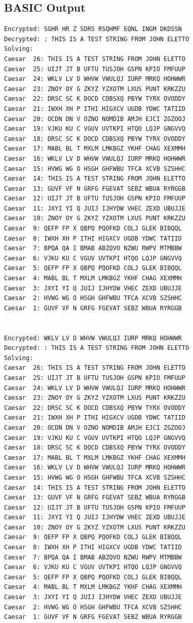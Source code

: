 \documentclass{report}
\begin{document}
\subsection*{BASIC Output}

\begin{lstlisting}
Encrypted: SGHR HR Z SDRS RSQHMF EQNL INGM DKDSSN
Decrypted: : THIS IS A TEST STRING FROM JOHN ELETTO
Solving:
Caesar  26: THIS IS A TEST STRING FROM JOHN ELETTO
Caesar  25: UIJT JT B UFTU TUSJOH GSPN KPIO FMFUUP
Caesar  24: WKLV LV D WHVW VWULQJ IURP MRKQ HOHWWR
Caesar  23: ZNOY OY G ZKYZ YZXOTM LXUS PUNT KRKZZU
Caesar  22: DRSC SC K DOCD CDBSXQ PBYW TYRX OVODDY
Caesar  21: IWXH XH P ITHI HIGXCV UGDB YDWC TATIID
Caesar  20: OCDN DN V OZNO NOMDIB AMJH EJCI ZGZOOJ
Caesar  19: VJKU KU C VGUV UVTKPI HTQO LQJP GNGVVQ
Caesar  18: DRSC SC K DOCD CDBSXQ PBYW TYRX OVODDY
Caesar  17: MABL BL T MXLM LMKBGZ YKHF CHAG XEXMMH
Caesar  16: WKLV LV D WHVW VWULQJ IURP MRKQ HOHWWR
Caesar  15: HVWG WG O HSGH GHFWBU TFCA XCVB SZSHHC
Caesar  14: THIS IS A TEST STRING FROM JOHN ELETTO
Caesar  13: GUVF VF N GRFG FGEVAT SEBZ WBUA RYRGGB
Caesar  12: UIJT JT B UFTU TUSJOH GSPN KPIO FMFUUP
Caesar  11: JXYI YI Q JUIJ IJHYDW VHEC ZEXD UBUJJE
Caesar  10: ZNOY OY G ZKYZ YZXOTM LXUS PUNT KRKZZU
Caesar  9: QEFP FP X QBPQ PQOFKD COLJ GLEK BIBQQL
Caesar  8: IWXH XH P ITHI HIGXCV UGDB YDWC TATIID
Caesar  7: BPQA QA I BMAB ABZQVO NZWU RWPV MTMBBW
Caesar  6: VJKU KU C VGUV UVTKPI HTQO LQJP GNGVVQ
Caesar  5: QEFP FP X QBPQ PQOFKD COLJ GLEK BIBQQL
Caesar  4: MABL BL T MXLM LMKBGZ YKHF CHAG XEXMMH
Caesar  3: JXYI YI Q JUIJ IJHYDW VHEC ZEXD UBUJJE
Caesar  2: HVWG WG O HSGH GHFWBU TFCA XCVB SZSHHC
Caesar  1: GUVF VF N GRFG FGEVAT SEBZ WBUA RYRGGB


Encrypted: WKLV LV D WHVW VWULQJ IURP MRKQ HOHWWR
Decrypted: : THIS IS A TEST STRING FROM JOHN ELETTO
Solving:
Caesar  26: THIS IS A TEST STRING FROM JOHN ELETTO
Caesar  25: UIJT JT B UFTU TUSJOH GSPN KPIO FMFUUP
Caesar  24: WKLV LV D WHVW VWULQJ IURP MRKQ HOHWWR
Caesar  23: ZNOY OY G ZKYZ YZXOTM LXUS PUNT KRKZZU
Caesar  22: DRSC SC K DOCD CDBSXQ PBYW TYRX OVODDY
Caesar  21: IWXH XH P ITHI HIGXCV UGDB YDWC TATIID
Caesar  20: OCDN DN V OZNO NOMDIB AMJH EJCI ZGZOOJ
Caesar  19: VJKU KU C VGUV UVTKPI HTQO LQJP GNGVVQ
Caesar  18: DRSC SC K DOCD CDBSXQ PBYW TYRX OVODDY
Caesar  17: MABL BL T MXLM LMKBGZ YKHF CHAG XEXMMH
Caesar  16: WKLV LV D WHVW VWULQJ IURP MRKQ HOHWWR
Caesar  15: HVWG WG O HSGH GHFWBU TFCA XCVB SZSHHC
Caesar  14: THIS IS A TEST STRING FROM JOHN ELETTO
Caesar  13: GUVF VF N GRFG FGEVAT SEBZ WBUA RYRGGB
Caesar  12: UIJT JT B UFTU TUSJOH GSPN KPIO FMFUUP
Caesar  11: JXYI YI Q JUIJ IJHYDW VHEC ZEXD UBUJJE
Caesar  10: ZNOY OY G ZKYZ YZXOTM LXUS PUNT KRKZZU
Caesar  9: QEFP FP X QBPQ PQOFKD COLJ GLEK BIBQQL
Caesar  8: IWXH XH P ITHI HIGXCV UGDB YDWC TATIID
Caesar  7: BPQA QA I BMAB ABZQVO NZWU RWPV MTMBBW
Caesar  6: VJKU KU C VGUV UVTKPI HTQO LQJP GNGVVQ
Caesar  5: QEFP FP X QBPQ PQOFKD COLJ GLEK BIBQQL
Caesar  4: MABL BL T MXLM LMKBGZ YKHF CHAG XEXMMH
Caesar  3: JXYI YI Q JUIJ IJHYDW VHEC ZEXD UBUJJE
Caesar  2: HVWG WG O HSGH GHFWBU TFCA XCVB SZSHHC
Caesar  1: GUVF VF N GRFG FGEVAT SEBZ WBUA RYRGGB

\end{lstlisting}
\end{document}
